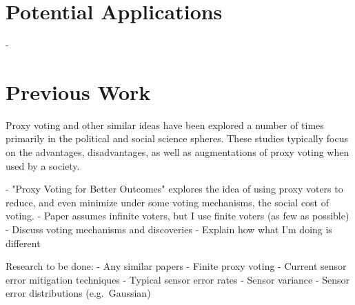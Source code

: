 

\section{Potential Applications}\label{sec:potential-applications}
- %


\section{Previous Work}\label{sec:previous-work}  %
Proxy voting and other similar ideas have been explored a number of times
primarily in the political and social science spheres\cite{Cohensius2017, Mueller1972, Zhang2022, Golz2021}.
These studies typically focus on the advantages, disadvantages, as well as
augmentations of proxy voting when used by a society.

- "Proxy Voting for Better Outcomes"\cite{Cohensius2017} explores the idea of
using proxy voters to reduce, and even minimize under some voting mechanisms,
the social cost of voting.
- Paper assumes infinite voters, but I use finite voters (as few as possible)
- Discuss voting mechanisms and discoveries
- Explain how what I'm doing is different

Research to be done:
- Any similar papers
- Finite proxy voting
- Current sensor error mitigation techniques
- Typical sensor error rates
- Sensor variance
- Sensor error distributions (e.g.\ Gaussian)

